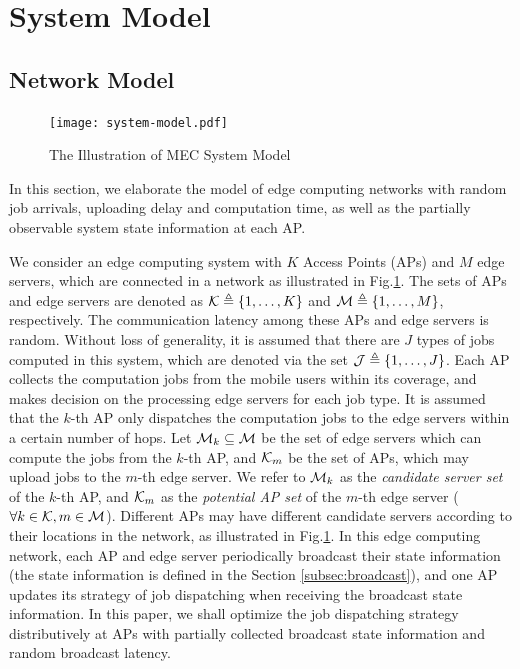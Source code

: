 \section{System Model}
\label{sec:model}
\subsection{Network Model}
\begin{figure}[htp!]
    \centering
    \texttt{[image: system-model.pdf]}
    \caption{The Illustration of MEC System Model}
    \label{fig:system}
\end{figure}

In this section, we elaborate the model of edge computing networks with random job arrivals, uploading delay and computation time, as well as the partially observable system state information at each AP.

We consider an edge computing system with $K$ Access Points (APs) and $M$ edge servers, which are connected in a network as illustrated in Fig.\ref{fig:system}.
The sets of APs and edge servers are denoted as $\mathcal{K} \triangleq \{1,\dots,K\}$ and $\mathcal{M} \triangleq \{1,\dots,M\}$, respectively.
The communication latency among these APs and edge servers is random.
Without loss of generality, it is assumed that there are $J$ types of jobs computed in this system, which are denoted via the set $\mathcal{J} \triangleq \{1,\dots,J\}$.
Each AP collects the computation jobs from the mobile users within its coverage, and makes decision on the processing edge servers for each job type.
It is assumed that the $k$-th AP only dispatches the computation jobs to the edge servers within a certain number of hops.
Let $\mathcal{M}_{k} \subseteq \mathcal{M}$ be the set of edge servers which can compute the jobs from the $k$-th AP, and $\mathcal{K}_{m}$ be the set of APs, which may upload jobs to the $m$-th edge server.
We refer to $\mathcal{M}_{k}$ as the \emph{candidate server set} of the $k$-th AP, and $\mathcal{K}_{m}$ as the \emph{potential AP set} of the $m$-th edge server ($\forall k\in\mathcal{K}, m\in\mathcal{M}$).
Different APs may have different candidate servers according to their locations in the network, as illustrated in Fig.\ref{fig:system}.
In this edge computing network, each AP and edge server periodically broadcast their state information (the state information is defined in the Section \ref{subsec:broadcast}), and one AP updates its strategy of job dispatching when receiving the broadcast state information.
In this paper, we shall optimize the job dispatching strategy distributively at APs with partially collected broadcast state information and random broadcast latency.

